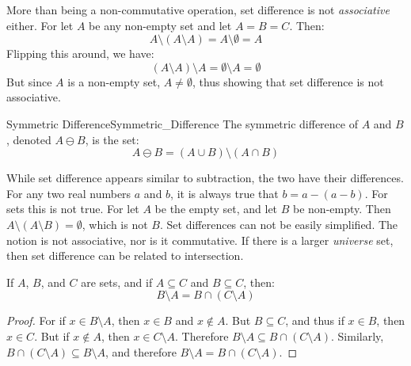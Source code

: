         \begin{example}
            More than being a non-commutative operation, set difference is not
            \textit{associative} either. For let $A$ be any non-empty set and
            let $A=B=C$. Then:
            \begin{equation}
                A\setminus(A\setminus{A})=A\setminus\emptyset=A
            \end{equation}
            Flipping this around, we have:
            \begin{equation}
                (A\setminus{A})\setminus{A}=\emptyset\setminus{A}=\emptyset
            \end{equation}
            But since $A$ is a non-empty set, $A\ne\emptyset$, thus showing
            that set difference is not associative.
        \end{example}
        \begin{ldefinition}{Symmetric Difference}{Symmetric_Difference}
            The symmetric difference of $A$ and $B$, denoted $A\ominus{B}$, is
            the set:
            \begin{equation}
                A\ominus{B}
                =(A\cup{B})\setminus(A\cap{B})
            \end{equation}
        \end{ldefinition}
        While set difference appears similar to subtraction, the two have their
        differences. For any two real numbers $a$ and $b$, it is always true
        that $b=a-(a-b)$. For sets this is not true. For let $A$ be the empty
        set, and let $B$ be non-empty. Then
        $A\setminus(A\setminus{B})=\emptyset$, which is not $B$. Set differences
        can not be easily simplified. The notion is not associative, nor is it
        commutative. If there is a larger \textit{universe} set, then set
        difference can be related to intersection.
        \begin{theorem}
            \label{thm:Set_Difference_As_Intersection}%
            If $A$, $B$, and $C$ are sets, and if $A\subseteq{C}$ and
            $B\subseteq{C}$, then:
            \begin{equation}
                B\setminus{A}=B\cap(C\setminus{A})
            \end{equation}
        \end{theorem}
        \begin{proof}
            For if $x\in{B}\setminus{A}$, then
            $x\in{B}$ and $x\notin{A}$. But
            $B\subseteq{C}$, and thus if $x\in{B}$, then
            $x\in{C}$. But if $x\notin{A}$, then
            $x\in{C}\setminus{A}$. Therefore
            $B\setminus{A}\subseteq{B}\cap(C\setminus{A})$.
            Similarly,
            $B\cap(C\setminus{A})\subseteq{B}\setminus{A}$,
            and therefore
            $B\setminus{A}={B}\cap(C\setminus{A})$.
        \end{proof}
